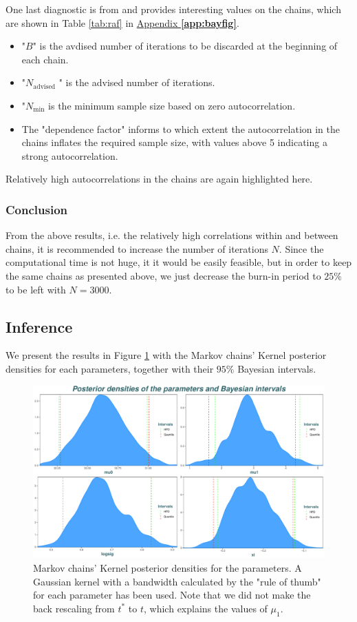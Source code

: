 One last diagnostic is from \citet{raftery1992} and provides interesting values on the chains, which are shown in Table \ref{tab:raf} in \hyperref[app:bayfig]{Appendix \textbf{\ref{app:bayfig}}}.

\begin{itemize} 
\item "$B$" is the avdised number of iterations to be discarded at the beginning of each chain.
\item "$N_{\text{advised}}$ " is the advised number of iterations.
\item "$N_{\text{min}}$ is the minimum sample size based on zero autocorrelation.
\item The "dependence factor" informs to which extent the autocorrelation in the chains inflates the required sample size, with values above 5 indicating a strong autocorrelation. 
\end{itemize}
Relatively high autocorrelations in the chains are again highlighted here.



\subsubsection*{Conclusion}

From the above results, i.e. the relatively high correlations within and between chains, it is recommended to increase the number of iterations $N$. Since the computational time is not huge, it it would be easily feasible, but in order to keep the same chains as presented above, we just decrease the burn-in period to $25\%$ to be left with $N=3000$. 


\subsection{Inference}\label{sec:bayinfci}

We present the results in Figure \ref{fig:postdens} with the Markov chains' Kernel posterior densities for each parameters, together with their $95\%$ Bayesian intervals. 

\begin{figure}[!htb]
	\centering	\includegraphics[width=0.8\linewidth]{postdens.pdf}\caption{Markov chains' Kernel posterior densities for the parameters. A Gaussian kernel with a bandwidth calculated by the \citet[pp.48, (3.31)]{silverman_1986} "rule of thumb" for each parameter has been used. Note that we did not make the back rescaling from $t^*$ to $t$, which explains the values of $\mu_1$.}\label{fig:postdens}
\end{figure}

